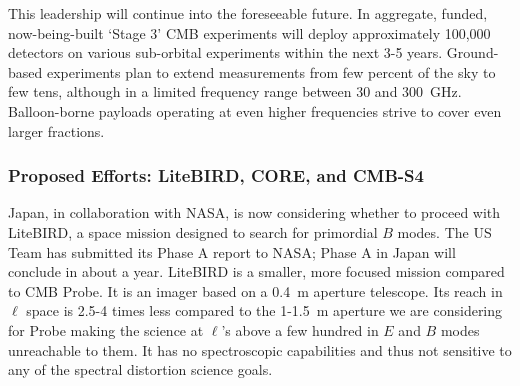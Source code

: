 This leadership will continue into the foreseeable future. In aggregate, funded, now-being-built 
`Stage 3' CMB experiments will deploy approximately 100,000 detectors on various sub-orbital 
experiments within the next 3-5 years. 
Ground-based experiments plan to extend measurements from few percent of the sky to 
few tens, although in a limited frequency range between 30 and 300~GHz. Balloon-borne 
payloads operating at even higher frequencies strive to cover even larger fractions.  



\vspace{-0.18in}

\subsubsection{Proposed Efforts: LiteBIRD, CORE, and CMB-S4} 

\vspace{-0.05in}

Japan, in collaboration with NASA, is now considering whether to proceed with LiteBIRD, a space mission 
designed to search for primordial $B$ modes. The US Team has submitted its Phase A report to NASA; Phase A 
in Japan will conclude in about a year. LiteBIRD is a smaller, more focused
mission compared to CMB Probe. It is an imager based on a 0.4~m aperture 
telescope. Its reach in $\ell$ space is 2.5-4 times less compared to the 1-1.5~m aperture 
we are considering for Probe making the science at $\ell$'s above a 
few hundred in $E$ and $B$ modes unreachable to them. 
It has no spectroscopic capabilities and thus not sensitive to any of the spectral distortion science goals. 

